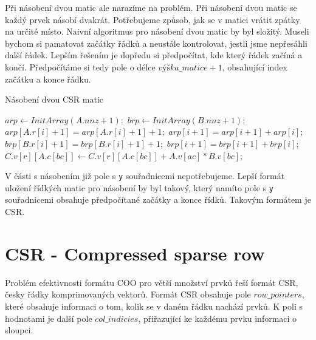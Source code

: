 Při násobení dvou matic ale narazíme na problém. Při násobení dvou matic se každý prvek násobí dvakrát. Potřebujeme způsob, jak se v matici vrátit zpátky na určité místo. Naivní algoritmus pro násobení dvou matic by byl složitý. Museli bychom si pamatovat začátky řádků a neustále kontrolovat, jestli jsme nepřesáhli další řádek. Lepším řešením je dopředu si předpočítat, kde který řádek začíná a končí. Předpočítáme si tedy pole o délce $výška\_ matice + 1$, obsahující index začátku a konce řádku.

\begin{algorithm}[H]
	\caption{Násobení dvou CSR matic}\label{coo-mmm}
	\begin{algorithmic}[1]
		\State \texttt{$arp\gets InitArray(A.nnz + 1);$}
		\State \texttt{$brp\gets InitArray(B.nnz + 1);$}
			\State \texttt{$arp[A.r[i]+1] = arp[A.r[i]+1] + 1;$}
		\EndFor
			\State \texttt{$arp[i+1] = arp[i+1] + arp[i];$}
		\EndFor
			\State \texttt{$brp[B.r[i]+1] = brp[B.r[i]+1] + 1;$}
		\EndFor
			\State \texttt{$brp[i+1] = brp[i+1] + brp[i];$}
		\EndFor
					\State \texttt{$C.v[r][A.c[bc]] \gets C.v[r][A.c[bc]] + A.v[ac] * B.v[bc];$}
				\EndFor
			\EndFor
		\EndFor
		\EndProcedure
	\end{algorithmic}
\end{algorithm}

V části s násobením již pole s \texttt{y} souřadnicemi nepotřebujeme. Lepší formát uložení řídkých matic pro násobení by byl takový, který namíto pole s \texttt{y} souřadnicemi obsahuje předpočítané začátky a konce řídků. Takovým formátem je CSR.

\section{CSR - Compressed sparse row}

Problém efektivnosti formátu COO pro větší množství prvků řeší formát CSR, česky řádky komprimovaných vektorů. Formát CSR obsahuje pole $row\_pointers$, které obsahuje informaci o tom, kolik se v daném řádku nachází prvků. K poli s hodnotami je další pole $col\_indicies$, přiřazující ke každému prvku informaci o sloupci.

